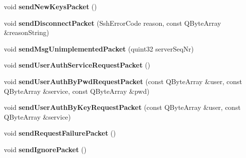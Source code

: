 \begin{DoxyCompactItemize}
\item 
\mbox{\label{class_q_ssh_1_1_internal_1_1_ssh_send_facility_ae5735ca1f749d3b65399ec10ac9eff95}} 
void {\bfseries send\+New\+Keys\+Packet} ()
\item 
\mbox{\label{class_q_ssh_1_1_internal_1_1_ssh_send_facility_ac7094a183f8f3db61baf49677284876f}} 
void {\bfseries send\+Disconnect\+Packet} (Ssh\+Error\+Code reason, const Q\+Byte\+Array \&reason\+String)
\item 
\mbox{\label{class_q_ssh_1_1_internal_1_1_ssh_send_facility_a35ed8ed711cd7dfdcd35a0be37f404af}} 
void {\bfseries send\+Msg\+Unimplemented\+Packet} (quint32 server\+Seq\+Nr)
\item 
\mbox{\label{class_q_ssh_1_1_internal_1_1_ssh_send_facility_a90b571f9ce1fb6e468eeeab8ad6b25da}} 
void {\bfseries send\+User\+Auth\+Service\+Request\+Packet} ()
\item 
\mbox{\label{class_q_ssh_1_1_internal_1_1_ssh_send_facility_a91265dde71c58b327b4cb4311104404a}} 
void {\bfseries send\+User\+Auth\+By\+Pwd\+Request\+Packet} (const Q\+Byte\+Array \&user, const Q\+Byte\+Array \&service, const Q\+Byte\+Array \&pwd)
\item 
\mbox{\label{class_q_ssh_1_1_internal_1_1_ssh_send_facility_a213136dea131cd60bc16e7636ca973be}} 
void {\bfseries send\+User\+Auth\+By\+Key\+Request\+Packet} (const Q\+Byte\+Array \&user, const Q\+Byte\+Array \&service)
\item 
\mbox{\label{class_q_ssh_1_1_internal_1_1_ssh_send_facility_aaf7ff60a28fdbfb5b775a2d8384419aa}} 
void {\bfseries send\+Request\+Failure\+Packet} ()
\item 
\mbox{\label{class_q_ssh_1_1_internal_1_1_ssh_send_facility_a5a8ad4ef5a47048a616116444b26359a}} 
void {\bfseries send\+Ignore\+Packet} ()
\item 

\end{DoxyCompactItemize}
